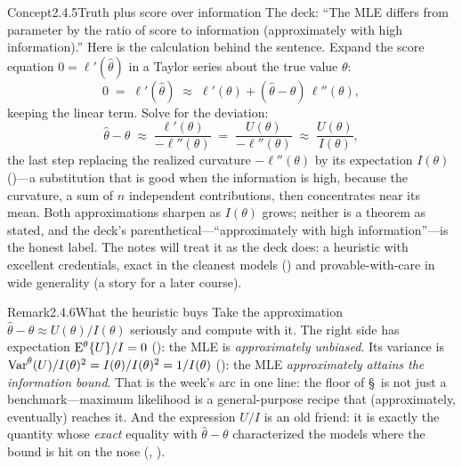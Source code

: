 \documentclass[main.tex]{subfiles}
\begin{document}
\begin{ObjL}{Concept}{2.4.5}{Truth plus score over information}
The deck: ``The MLE differs from parameter by the ratio of score to information
(approximately with high information).'' Here is the calculation behind the sentence. Expand
the score equation $0=\ell'(\hat\theta)$ in a Taylor series about the true value $\theta$:
\[ 0 \;=\; \ell'(\hat\theta) \;\approx\; \ell'(\theta) + (\hat\theta-\theta)\,
   \ell''(\theta) , \]
keeping the linear term. Solve for the deviation:
\[ \hat\theta - \theta \;\approx\; \frac{\ell'(\theta)}{-\ell''(\theta)}
   \;=\; \frac{U(\theta)}{-\ell''(\theta)}
   \;\approx\; \frac{U(\theta)}{I(\theta)} , \]
the last step replacing the realized curvature $-\ell''(\theta)$ by its expectation
$I(\theta)$ ()---a substitution that is good when the information is high,
because the curvature, a sum of $n$ independent contributions, then concentrates near its
mean. Both approximations sharpen as $I(\theta)$ grows; neither is a theorem as stated, and
the deck's parenthetical---``approximately with high information''---is the honest label.
The notes will treat it as the deck does: a heuristic with excellent credentials, exact in
the cleanest models () and provable-with-care in wide generality (a story for a
later course).
\end{ObjL}

\begin{ObjL}{Remark}{2.4.6}{What the heuristic buys}
Take the approximation $\hat\theta-\theta\approx U(\theta)/I(\theta)$ seriously and compute
with it. The right side has expectation $\mathrm{E}^{\theta}\{U\}/I=0$ (): the MLE is
\emph{approximately unbiased}. Its variance is
$\operatorname{Var}^{\theta}(U)/I(\theta)^2=I(\theta)/I(\theta)^2=1/I(\theta)$ (): the MLE
\emph{approximately attains the information bound}. That is the week's arc in one line: the
floor of \S\, is not just a benchmark---maximum likelihood is a general-purpose
recipe that (approximately, eventually) reaches it. And the expression $U/I$ is an old
friend: it is exactly the quantity whose \emph{exact} equality with $\hat\theta-\theta$
characterized the models where the bound is hit on the nose
(, ).
\end{ObjL}
\end{document}
